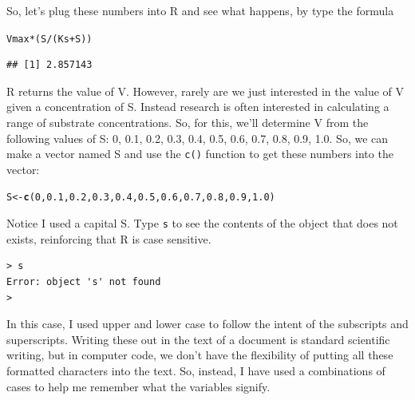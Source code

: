 \documentclass{tufte-handout}\usepackage[]{graphicx}\usepackage[]{color}
\makeatletter
\newcommand{\hlnum}[1]{\textcolor[rgb]{0.686,0.059,0.569}{#1}}%
\newcommand{\hlopt}[1]{\textcolor[rgb]{0,0,0}{#1}}%
\newcommand{\hlstd}[1]{\textcolor[rgb]{0.345,0.345,0.345}{#1}}%
\newcommand{\hlkwb}[1]{\textcolor[rgb]{0.69,0.353,0.396}{#1}}%
\newcommand{\hlkwd}[1]{\textcolor[rgb]{0.737,0.353,0.396}{\textbf{#1}}}%
\newenvironment{kframe}{%
 \def\at@end@of@kframe{}%
 \ifinner\ifhmode%
  \def\at@end@of@kframe{\end{minipage}}%
  \begin{minipage}{\columnwidth}%
 \fi\fi%
 \def\FrameCommand##1{\hskip\@totalleftmargin \hskip-\fboxsep
 \colorbox{shadecolor}{##1}\hskip-\fboxsep
     \hskip-\linewidth \hskip-\@totalleftmargin \hskip\columnwidth}%
 \MakeFramed {\advance\hsize-\width
   \@totalleftmargin\z@ \linewidth\hsize
   \@setminipage}}%
 {\par\unskip\endMakeFramed%
 \at@end@of@kframe}
\newenvironment{knitrout}{}{} %
\makeatother
\begin{document}
So, let's plug these numbers into R and see what happens, by type the formula

\begin{knitrout}
\color{fgcolor}\begin{kframe}
\begin{alltt}
\hlstd{Vmax}\hlopt{*}\hlstd{(S}\hlopt{/}\hlstd{(Ks} \hlopt{+} \hlstd{S))}
\end{alltt}
\begin{verbatim}
## [1] 2.857143
\end{verbatim}
\end{kframe}
\end{knitrout}

R returns the value of V. However, rarely are we just interested in the value of V given a concentration of S. Instead research is often interested in calculating a range of substrate concentrations. So, for this, we'll determine V from the following values of S: 0, 0.1, 0.2, 0.3, 0.4, 0.5, 0.6, 0.7, 0.8, 0.9, 1.0. So, we can make a vector named S and use the \texttt{c()} function to get these numbers into the vector:
 
\begin{knitrout}
\color{fgcolor}\begin{kframe}
\begin{alltt}
\hlstd{S} \hlkwb{<-} \hlkwd{c}\hlstd{(}\hlnum{0}\hlstd{,} \hlnum{0.1}\hlstd{,} \hlnum{0.2}\hlstd{,} \hlnum{0.3}\hlstd{,} \hlnum{0.4}\hlstd{,} \hlnum{0.5}\hlstd{,} \hlnum{0.6}\hlstd{,} \hlnum{0.7}\hlstd{,} \hlnum{0.8}\hlstd{,} \hlnum{0.9}\hlstd{,} \hlnum{1.0}\hlstd{)}
\end{alltt}
\end{kframe}
\end{knitrout}

Notice I used a capital S. Type \texttt{s} to see the contents of the object that does not exists, reinforcing that R is case sensitive.  

\begin{verbatim}
> s
Error: object 's' not found
>
\end{verbatim}

In this case, I used upper and lower case to follow the intent of the subscripts and superscripts. Writing these out in the text of a document is standard scientific writing, but in computer code, we don't have the flexibility of putting all these formatted characters into the text. So, instead, I have used a combinations of cases to help me remember what the variables signify. 
\end{document}
